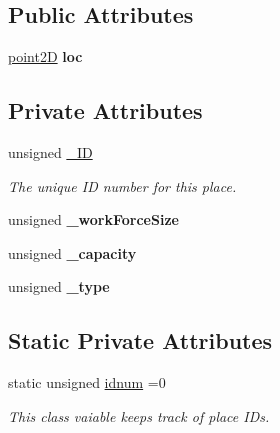 \subsection*{Public Attributes}
\begin{DoxyCompactItemize}
\item 
\mbox{\label{classplace_a30abc26da34316006bac7d17398f0076}} 
\mbox{\hyperlink{classpoint2D}{point2D}} {\bfseries loc}
\end{DoxyCompactItemize}
\subsection*{Private Attributes}
\begin{DoxyCompactItemize}
\item 
\mbox{\label{classplace_a905b649d1f98547cc33d49226f4e56e1}} 
unsigned \mbox{\hyperlink{classplace_a905b649d1f98547cc33d49226f4e56e1}{\+\_\+\+ID}}
\begin{DoxyCompactList}\small\item\em The unique ID number for this place. \end{DoxyCompactList}\item 
\mbox{\label{classplace_a675f8c9a2bd0c57ac1aaf0364cd63411}} 
unsigned {\bfseries \+\_\+work\+Force\+Size}
\item 
\mbox{\label{classplace_ac74e8a9d1409cec4421a038885012a8b}} 
unsigned {\bfseries \+\_\+capacity}
\item 
\mbox{\label{classplace_a4289f32750fe9e9b0632afe207dd999b}} 
unsigned {\bfseries \+\_\+type}
\end{DoxyCompactItemize}
\subsection*{Static Private Attributes}
\begin{DoxyCompactItemize}
\item 
\mbox{\label{classplace_af35d12619e41bd59aa91db9977fc8dc9}} 
static unsigned \mbox{\hyperlink{classplace_af35d12619e41bd59aa91db9977fc8dc9}{idnum}} =0
\begin{DoxyCompactList}\small\item\em This class vaiable keeps track of place I\+Ds. \end{DoxyCompactList}\end{DoxyCompactItemize}


